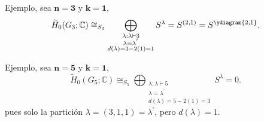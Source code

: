 \documentclass[final,xcolor=svgnames]{beamer}
\begin{document}
\begin{frame}{}
\begin{columns}
\begin{column}{0.5\textwidth}
        \begin{block}{Ejemplo, sea $\boldsymbol{n=3}$ y $\boldsymbol{k=1}$,}
          \begin{equation*}
            \widetilde H_{0}(G_{3};\mathbb{C})\cong_{S_{3}}\bigoplus_{\substack{\lambda:\lambda\vdash 3\\
              \lambda=\lambda^{'}\\d(\lambda)=3-2(1)=1}} S^{\lambda}=S^{(2,1)}=S^{\ydiagram{2,1}}.
          \end{equation*}
       \end{block}

       \begin{block}{Ejemplo, sea $\boldsymbol{n=5}$ y $\boldsymbol{k=1}$,}
         \begin{equation*}
           \widetilde H_{0}(G_{5};\mathbb{C})\cong_{S_{5}}\bigoplus_{\substack{\lambda:\lambda\vdash 5\\
               \lambda=\lambda^{'}\\d(\lambda)=5-2(1)=3}} S^{\lambda}=0.
         \end{equation*}
         pues solo la partición $\lambda=(3,1,1)=\lambda^{'}$, pero $d(\lambda)=1$.
       \end{block}
      

\end{column}
\end{columns}
\end{frame}
\end{document}
